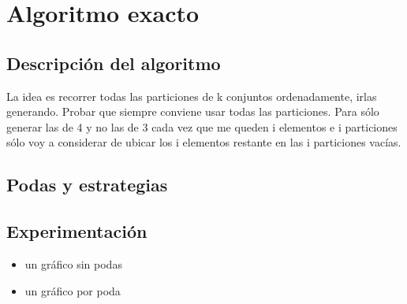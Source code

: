 \section{Algoritmo exacto}

\subsection{Descripción del algoritmo}
La idea es recorrer todas las particiones de k conjuntos ordenadamente, irlas generando.
Probar que siempre conviene usar todas las particiones.
Para sólo generar las de 4 y no las de 3 cada vez que me queden i elementos e i particiones 
sólo voy a considerar de ubicar los i elementos restante en las i particiones vacías.
\subsection{Podas y estrategias}
\subsection{Experimentación}
\begin{itemize}
  \item un gráfico sin podas
  \item un gráfico por poda
\end{itemize}
